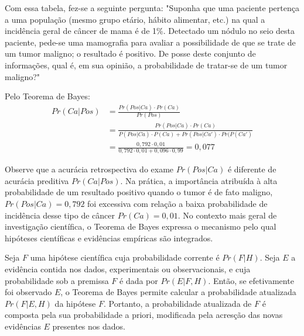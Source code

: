 Com essa tabela, fez-se a seguinte pergunta: "Suponha que uma paciente pertença a uma população (mesmo grupo etário, hábito alimentar, etc.) na qual a incidência geral de câncer de mama é de 1\%. Detectado um nódulo no seio desta paciente, pede-se uma mamografia para avaliar a possibilidade de que se trate de um tumor maligno; o resultado é positivo. De posse deste conjunto de informações, qual é, em sua opinião, a probabilidade de tratar-se de um tumor maligno?"

Pelo Teorema de Bayes:
\begin{equation}
\begin{split}
Pr(Ca|Pos) & = \frac{Pr(Pos|Ca) \cdot Pr(Ca)}{Pr(Pos)} \\
& = \frac{Pr(Pos|Ca) \cdot Pr(Ca)}{P(Pos|Ca) \cdot P(Ca) + Pr(Pos|Ca') \cdot Pr(P(Ca')} \\
& = \frac{0,792 \cdot 0,01}{0,792 \cdot 0,01 + 0,096 \cdot 0,99} = 0,077
\end{split}
\end{equation}

Observe que a acurácia retrospectiva do exame $Pr(Pos|Ca)$ é diferente de acurácia preditiva $Pr(Ca|Pos)$. Na prática, a importância atribuída à alta probabilidade de um resultado positivo quando o tumor é de fato maligno, $Pr(Pos|Ca) = 0,792$ foi excessiva com relação a baixa probabilidade de incidência desse tipo de câncer $Pr(Ca)=0,01$. No contexto mais geral de investigação científica, o Teorema de Bayes expressa o mecanismo pelo qual hipóteses científicas e evidências empíricas são integrados.

Seja $F$ uma hipótese científica cuja probabilidade corrente é $Pr(F|H)$. Seja $E$ a evidência contida nos dados, experimentais ou observacionais, e cuja probabilidade sob a premissa $F$ é dada por $Pr(E|F,H)$. Então, se efetivamente foi observado $E$, o Teorema de Bayes permite calcular a probabilidade atualizada $Pr(F|E,H)$ da hipótese $F$. Portanto, a probabilidade atualizada de $F$ é composta pela sua probabilidade a priori, modificada pela acresção das novas evidências $E$ presentes nos dados.